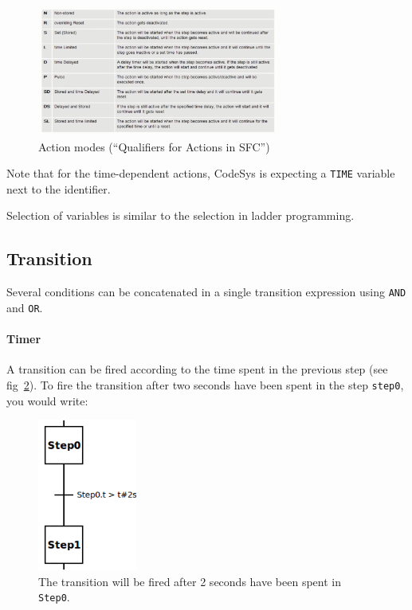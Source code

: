 \documentclass[10pt,a4paper]{article}
\begin{document}
\begin{figure}[h!]
	\begin{center}
		\includegraphics[width=300px]{tableaugrafcet.png}
	\end{center}
\caption{Action modes (``Qualifiers for Actions in SFC'')}
\label{fig:tabgraf}
\end{figure}

Note that for the time-dependent actions, CodeSys is expecting a \texttt{TIME} variable next to the identifier.

Selection of variables is similar to the selection in ladder programming.

\subsection{Transition}
Several conditions can be concatenated in a single transition expression using \texttt{AND} and \texttt{OR}.

\paragraph{Timer}
A transition can be fired according to the time spent in the previous step (see fig~\ref{fig:transition-timer}).
To fire the transition after two seconds have been spent in the step \texttt{step0}, you would write:

\begin{figure}
  \begin{center}
    \includegraphics[height=5cm]{transition-timer.png}
  \end{center}
  \caption{The transition will be fired after 2 seconds have been spent in \texttt{Step0}.}
  \label{fig:transition-timer}
\end{figure}
\end{document}
